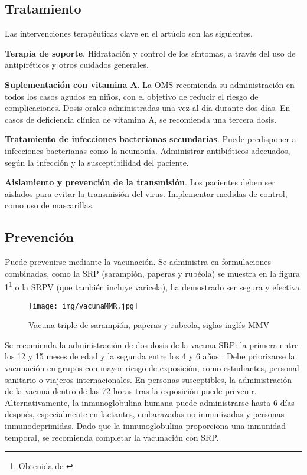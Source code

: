 \begin{enumerate}
\subsection{Tratamiento}
Las intervenciones terapéuticas clave en el artúclo \cite{graber2020update} son las siguientes.

\textbf{Terapia de soporte}.
Hidratación y control de los síntomas, a través del uso de antipiréticos y otros cuidados generales.

\textbf{Suplementación con vitamina A}.
La OMS recomienda su administración en todos los casos agudos en niños, con el objetivo de reducir el riesgo de complicaciones.
Dosis orales administradas una vez al día durante dos días. En casos de deficiencia clínica de vitamina A, se recomienda una tercera dosis.

\textbf{Tratamiento de infecciones bacterianas secundarias}.
Puede predisponer a infecciones bacterianas como la neumonía. Administrar antibióticos adecuados, según la infección y la susceptibilidad del paciente.

\textbf{Aislamiento y prevención de la transmisión}.
Los pacientes deben ser aislados para evitar la transmisión del virus. Implementar medidas de control, como uso de mascarillas.

\subsection{Prevención}
Puede prevenirse mediante la vacunación. Se administra en formulaciones combinadas, como la SRP (sarampión, paperas y rubéola) se muestra en la figura \ref{fig:vacuna sarampión}\footnote{Obtenida de \cite{aarp_sarampion_2019}} o la SRPV (que también incluye varicela), ha demostrado ser segura y efectiva.

\begin{figure}[H]
        \centering
        \texttt{[image: img/vacunaMMR.jpg]}
        \caption{Vacuna triple de sarampión, paperas y rubeola, siglas inglés MMV}
        \label{fig:vacuna sarampión}
        \vspace{0.5cm} %
\end{figure}

Se recomienda la administración de dos dosis de la vacuna SRP: la primera entre los 12 y 15 meses de edad y la segunda entre los 4 y 6 años \cite{gastanaduy2021measles}. Debe priorizarse la vacunación en grupos con mayor riesgo de exposición, como estudiantes, personal sanitario o viajeros internacionales.
En personas susceptibles, la administración de la vacuna dentro de las 72 horas tras la exposición puede prevenir. Alternativamente, la inmunoglobulina humana puede administrarse hasta 6 días después, especialmente en lactantes, embarazadas no inmunizadas y personas inmunodeprimidas. Dado que la inmunoglobulina proporciona una inmunidad temporal, se recomienda completar la vacunación con SRP.


\end{enumerate}
